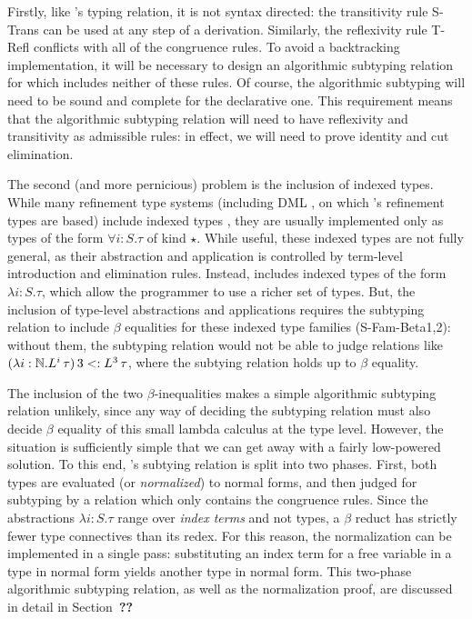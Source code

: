 Firstly, like \dlambdaamor's typing relation, it is not syntax directed: the transitivity rule S-Trans can be used at any step of a derivation. Similarly, the reflexivity rule T-Refl conflicts with all of the congruence rules. To avoid a backtracking implementation, it will be necessary to design an algorithmic subtyping relation for \bilambdaamor which includes neither of these rules. Of course, the algorithmic subtyping will need to be sound and complete for the declarative one. This requirement means that the algorithmic subtyping relation will need to have reflexivity and transitivity as admissible rules: in effect, we will need to prove identity and cut elimination.

The second (and more pernicious) problem is the inclusion of indexed types. While many refinement type systems (including DML \citehere, on which \lambdaamor's refinement types are based) include indexed types \citehere, they are usually implemented only as types of the form $\forall i : S. \tau$ of kind $\star$. While useful, these indexed types are not fully general, as their abstraction and application is controlled by term-level introduction and elimination rules. Instead, \dlambdaamor includes indexed types of the form $\lambda i : S. \tau$, which allow the programmer to use a richer set of types. But, the inclusion of type-level abstractions and applications requires the subtyping relation to include $\beta$ equalities for these indexed type families (S-Fam-Beta{1,2}): without them, the subtyping relation would not be able to judge relations like $(\lambda i : \mathbb{N}. L^i\, \tau) \, 3 <: L^3 \, \tau$, where the subtying relation holds up to $\beta$ equality.

The inclusion of the two $\beta$-inequalities makes a simple algorithmic subtyping relation unlikely, since any way of deciding the subtyping relation must also decide $\beta$ equality of this small lambda calculus at the type level. However, the situation is sufficiently simple that we can get away with a fairly low-powered solution. To this end, \bilambdaamor's subtying relation is split into two phases. First, both types are evaluated (or \textit{normalized}) to normal forms, and then judged for subtyping by a relation which only contains the congruence rules. Since the abstractions $\lambda i : S.\tau$ range over \textit{index terms} and not types, a $\beta$ reduct has strictly fewer type connectives than its redex. For this reason, the normalization can be implemented in a single pass: substituting an index term for a free variable in a type in normal form yields another type in normal form. This two-phase algorithmic subtyping relation, as well as the normalization proof, are discussed in detail in Section~\textbf{??}

